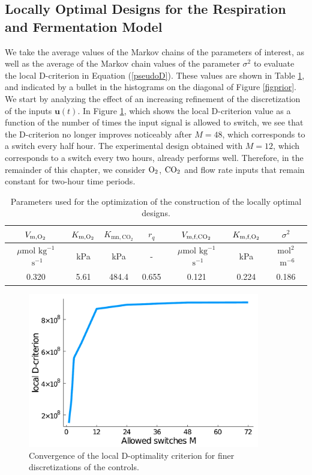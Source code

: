\subsection{Locally Optimal Designs for the Respiration and Fermentation Model}
We take the average values of the Markov chains of the parameters of interest, as well as the average of the Markov chain values of the parameter $\sigma^2$ to evaluate the local D-criterion in Equation (\ref{pseudoD}). These values are shown in Table \ref{tableLocal}, and indicated by a bullet in the histograms on the diagonal of Figure \ref{figprior}. We start by analyzing the effect of an increasing refinement of the discretization of the inputs $\bm u(t)$. In Figure \ref{figconvergence}, which shows the local D-criterion value as a function of the number of times the input signal is allowed to switch, we see that the D-criterion no longer improves noticeably after $M = 48$, which corresponds to a switch every half hour. The experimental design obtained with $M = 12$, which corresponds to a switch every two hours, already performs well. Therefore, in the remainder of this chapter, we consider $\text{O}_2$, $\text{CO}_2$ and flow rate inputs that remain constant for two-hour time periods.
\begin{table}[h!]
	\centering
	\setlength{\tabcolsep}{4pt} 
	\small
	\begin{tabular}{|c c c c c c c|}

		\hline
		$V_{\text{m},\text{O}_2}$ & $K_{\text{m},\text{O}_2}$ &  $K_{\text{mn},\text{CO}_2}$ & $r_q$ & $V_{\text{m,f,}\text{CO}_2}$ & $K_{\text{m,f},\text{O}_2}$ & $\sigma^2$\\ [0.5ex] 
		\hline
		$\mu$mol$\text{ kg}^{-1}$ $\text{ s}^{-1}$ & kPa & kPa & - & $\mu$mol$\text{ kg}^{-1}$ $\text{ s}^{-1}$& kPa & $\text{mol}^2$$\text{ m}^{-6}$	\\ [0.5ex] 
		\hline
		0.320 & 5.61 & 484.4 & 0.655 & 0.121 & 0.224 & 0.186\\ [1ex] 
		\hline
	\end{tabular}
	\caption{Parameters used for the optimization of the construction of the locally optimal designs.}
	\label{tableLocal} 
\end{table}
\begin{figure}[H]
	\centering
	\includegraphics[width=0.9\textwidth]{figure/paper 2/convergence.pdf}
	\caption{Convergence of the local D-optimality criterion for finer discretizations of the controls.}
	\label{figconvergence}
\end{figure}
